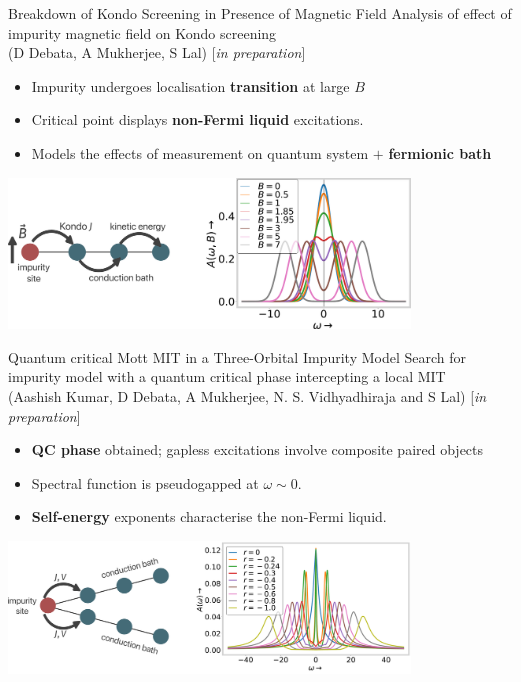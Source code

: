 \documentclass[11pt,aspectratio=169]{beamer}
\newcommand\focus[1]{%
	{\alert{\textbf{#1}}}
}
\begin{document}
\begin{frame}{Breakdown of Kondo Screening in Presence of Magnetic Field}
\flushleft
Analysis of effect of impurity magnetic field on Kondo screening \\
(D Debata, A Mukherjee, S Lal) [{\it in preparation}]\\[10pt]

\begin{itemize}
	\item Impurity undergoes localisation \focus{transition} at large \(B\)
	\item Critical point displays \focus{non-Fermi liquid} excitations.
	\item Models the effects of measurement on quantum system $+$ \focus{fermionic bath}
\end{itemize}

\vspace*{\fill}
\centering
\includegraphics[width=0.8\textwidth]{kondoBFieldSpecFunc.pdf}

\end{frame}

\begin{frame}{Quantum critical Mott MIT in a Three-Orbital Impurity Model}
\flushleft
Search for impurity model with a quantum critical phase intercepting a local MIT\\
(Aashish Kumar, D Debata, A Mukherjee, N. S. Vidhyadhiraja and S Lal) [{\it in preparation}]

\vspace*{\fill}
\begin{itemize}
	\item \focus{QC phase} obtained; gapless excitations involve composite paired objects
	\item Spectral function is pseudogapped at \(\omega \sim 0\).
	\item \focus{Self-energy} exponents characterise the non-Fermi liquid.
\end{itemize}

\vspace*{\fill}
\centering
\includegraphics[width=0.8\textwidth]{threeOrbitalSpecFunc.pdf}
\end{frame}
\end{document}
